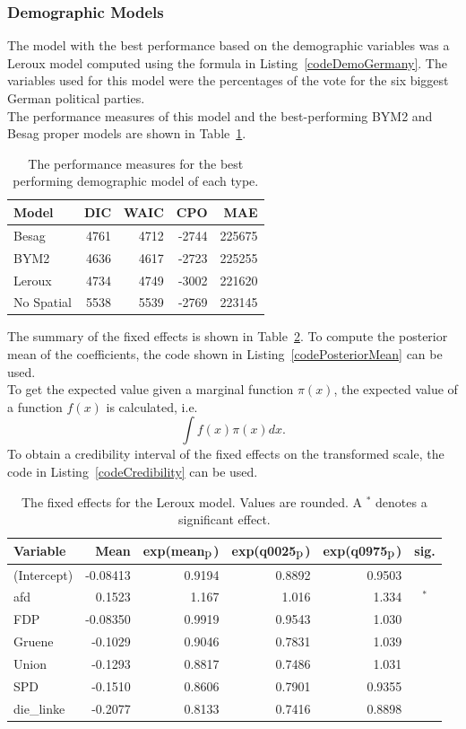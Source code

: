 \subsubsection{Demographic Models}\label{sssec:demoGermany}
The model with the best performance based on the demographic variables was a Leroux model computed using the formula in Listing~\ref{codeDemoGermany}. The variables used for this model were the percentages of the vote for the six biggest German political parties. \\
The performance measures of this model and the best-performing BYM2 and Besag proper models are shown in Table~\ref{demoGermany}. 
\begin{table}[H] 
\caption{The performance measures for the best performing demographic model of each type. \label{demoGermany}}
\begin{tabular}{l r r r r}
\toprule
\textbf{Model}	& \textbf{DIC}	& \textbf{WAIC} & \textbf{CPO} & \textbf{MAE}\\
\midrule
Besag  & 4761 & 4712 & -2744 &  225675 \\
BYM2 & 4636 & 4617  & -2723 &  225255\\
Leroux & 4734  & 4749 & -3002 & 221620\\
No Spatial & 5538  & 5539 & -2769 & 223145\\
\bottomrule
\end{tabular}
\end{table}
The summary of the fixed effects is shown in Table~\ref{fixedDemoGermany}. To compute the posterior mean of the coefficients, the code shown in Listing~\ref{codePosteriorMean} can be used. \\
To get the expected value given a marginal function $\pi\left(x\right)$, the expected value of a function $f\left(x\right)$ is calculated, i.e.
\begin{equation*}
    \int f\left(x\right)\pi\left(x\right)dx.
\end{equation*}
To obtain a credibility interval of the fixed effects on the transformed scale, the code in Listing~\ref{codeCredibility} can be used. \\
\begin{table}[H] 
\caption{The fixed effects for the Leroux model. Values are rounded. A $^*$ denotes a significant effect.\label{fixedDemoGermany}}
\begin{tabular}{l r r r r c}
\toprule
\textbf{Variable}	& \textbf{Mean}	& \textbf{exp(mean$_{\hbox{p}}$)} & \textbf{exp(q0025$_{\hbox{p}}$)} & \textbf{exp(q0975$_{\hbox{p}}$)} & \textbf{sig.}\\
\midrule
(Intercept) & -0.08413 & 0.9194 & 0.8892 & 0.9503 &\\
afd & 0.1523 & 1.167& 1.016 & 1.334 &$^*$\\
FDP & -0.08350 & 0.9919& 0.9543 & 1.030 &\\
Gruene & -0.1029 & 0.9046 & 0.7831 & 1.039 &\\
Union & -0.1293 & 0.8817& 0.7486 & 1.031 &\\
SPD & -0.1510 & 0.8606 & 0.7901 & 0.9355 &\\
die\_linke & -0.2077 & 0.8133 & 0.7416 & 0.8898 &\\
\bottomrule
\end{tabular}
\end{table}
